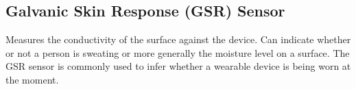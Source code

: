 \subsection{Galvanic Skin Response (GSR) Sensor}
\label{sub:galvanic_skin_respons_sensor}
Measures the conductivity of the surface against the device. Can indicate whether or not a person is sweating or more generally the moisture level on a surface. The GSR sensor is commonly used to infer whether a wearable device is being worn at the moment. 

